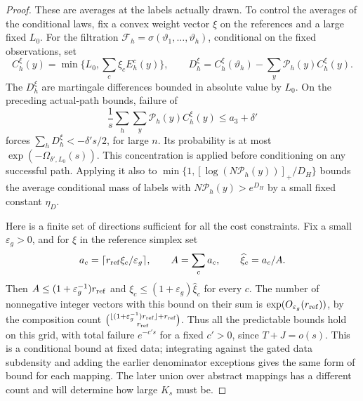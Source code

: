 \begin{proof}
These are averages at the labels actually drawn. To control the averages
of the conditional laws, fix a convex weight vector \(\xi\) on the
references and a large fixed \(L_0\). For the filtration
\(\mathcal F_h=\sigma(\vartheta_1,\ldots,\vartheta_h)\), conditional
on the fixed observations, set
\[
 C_h^\xi(y)=\min\{L_0,\sum_c\xi_cE_h^c(y)\},\qquad
 D_h^\xi=C_h^\xi(\vartheta_h)
                -\sum_y\mathcal P_h(y)C_h^\xi(y).
\]
The \(D_h^\xi\) are martingale differences bounded in absolute value
by \(L_0\). On the preceding actual-path bounds, failure of
\[
 \frac1s\sum_h\sum_y\mathcal P_h(y)C_h^\xi(y)
       \le a_3+\delta'
\]
forces \(\sum_hD_h^\xi<-\delta's/2\), for large \(n\). Its probability
is at most \(\exp(-\Omega_{\delta',L_0}(s))\). This concentration is
applied before conditioning on any successful path. Applying it also to
\(\min\{1,[\log(N\mathcal P_h(y))]_+/D_H\}\) bounds the average
conditional mass of labels with \(N\mathcal P_h(y)>e^{D_H}\) by a
small fixed constant \(\eta_D\).

Here is a finite set of directions sufficient for all the cost
constraints. Fix a small \(\varepsilon_g>0\), and for
\(\xi\) in the reference simplex set
\[
 a_c=\lceil r_{\rm ref}\xi_c/\varepsilon_g\rceil,\qquad
 A=\sum_c a_c,\qquad \widehat\xi_c=a_c/A.
\]
Then \(A\le(1+\varepsilon_g^{-1})r_{\rm ref}\) and
\(\xi_c\le(1+\varepsilon_g)\widehat\xi_c\) for every \(c\).
The number of nonnegative integer vectors with this bound on their sum
is \(\exp(O_{\varepsilon_g}(r_{\rm ref}))\), by the composition count
\(\binom{\lfloor(1+\varepsilon_g^{-1})r_{\rm ref}\rfloor+r_{\rm ref}}
{r_{\rm ref}}\). Thus all the predictable bounds hold on this grid,
with total failure \(e^{-c's}\) for a fixed \(c'>0\), since
\(T+J=o(s)\). This is a conditional bound at fixed data; integrating
against the gated data subdensity and adding the earlier denominator
exceptions gives the same form of bound for each mapping. The later
union over abstract mappings has a different count and will determine
how large \(K_s\) must be.


\end{proof}
